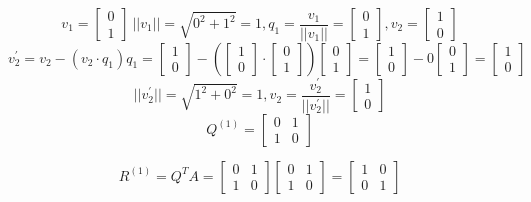 \documentclass[12pt]{article}
\begin{document}
\begin{enumerate}[leftmargin=0em]
\begin{enumerate}[leftmargin=!]
        \[v_{1}=\left[\begin{matrix}0\\ 1\end{matrix}\right]\
        ||v_{1}||=\sqrt{0^{2}+1^{2}}=1, 
        q_{1}=\frac{v_{1}}{||v_{1}||}=\left[\begin{matrix}0\\ 1\end{matrix}\right], 
        v_{2}=\left[\begin{matrix}1\\ 0\end{matrix}\right]\]
        \[v_{2}^{\prime }=v_{2}-(v_{2}\cdot q_{1})q_{1}=
        \left[\begin{matrix}1\\ 0\end{matrix}\right]-(\left[\begin{matrix}1\\ 0\end{matrix}\right]\cdot
        \left[\begin{matrix}0\\ 1\end{matrix}\right])
        \left[\begin{matrix}0\\ 1\end{matrix}\right]=
        \left[\begin{matrix}1\\ 0\end{matrix}\right]-0
        \left[\begin{matrix}0\\ 1\end{matrix}\right]=
        \left[\begin{matrix}1\\ 0\end{matrix}\right]\]
        \[||v_{2}^{\prime }||=\sqrt{1^{2}+0^{2}}=1, 
        v_{2}=\frac{v_{2}^{\prime }}{||v_{2}^{\prime }||}=\left[\begin{matrix}1\\ 0\end{matrix}\right]\]
        \[Q^{(1)}=\left[\begin{matrix}0&1\\ 1&0\end{matrix}\right]\]

        \[R^{(1)} = Q^{T}A = \left[\begin{matrix}0&1\\ 1&0\end{matrix}\right]\left[\begin{matrix}0&1\\ 1&0\end{matrix}\right]=\left[\begin{matrix}1&0\\ 0&1\end{matrix}\right]\]


\end{enumerate}
\end{enumerate}
\end{document}
